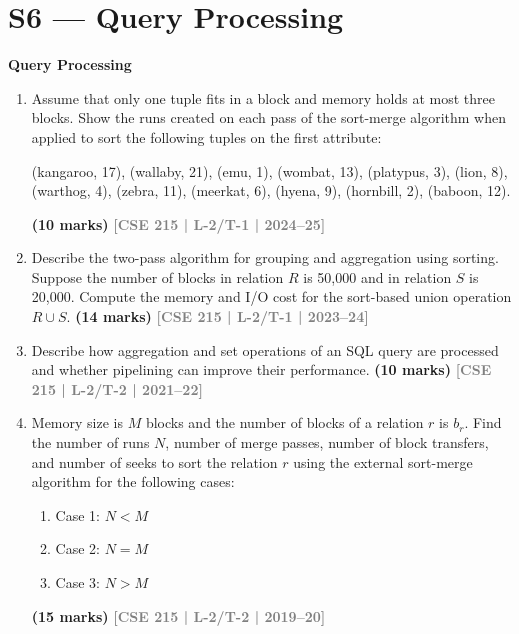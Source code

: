 \documentclass[12pt,a3paper]{article}
\newcommand{\yr}[1]{\hfill\textcolor{gray}{\small\textbf{[#1]}}}
\newcommand{\mk}[1]{\textcolor{orange!70!black}{\small\textbf{(#1 marks)}}}
\newcommand{\subtopic}[2]{%
  \vspace{10pt}
  \noindent\begin{tcolorbox}[colback=#1!8,colframe=#1,boxrule=0.6pt,arc=4pt,
    left=6pt,right=6pt,top=4pt,bottom=4pt]
    \small\bfseries\textcolor{#1}{#2}
  \end{tcolorbox}
  \vspace{2pt}
}
\begin{document}
\section{S6 --- Query Processing}
\label{sec:S6}

\subtopic{cD}{Query Processing}
\label{sub:s6-qp}

\begin{enumerate}

\item Assume that only one tuple fits in a block and memory holds at most three blocks. Show the runs created on each pass of the sort-merge algorithm when applied to sort the following tuples on the first attribute:
\begin{center}
(kangaroo, 17), (wallaby, 21), (emu, 1), (wombat, 13), (platypus, 3), (lion, 8),\\ (warthog, 4), (zebra, 11), (meerkat, 6), (hyena, 9), (hornbill, 2), (baboon, 12).
\end{center}
\mk{10} \yr{CSE 215 | L-2/T-1 | 2024--25}

\item Describe the two-pass algorithm for grouping and aggregation using sorting. Suppose the number of blocks in relation $R$ is 50,000 and in relation $S$ is 20,000. Compute the memory and I/O cost for the sort-based union operation $R \cup S$.
\mk{14} \yr{CSE 215 | L-2/T-1 | 2023--24}

\item Describe how aggregation and set operations of an SQL query are processed and whether pipelining can improve their performance.
\mk{10} \yr{CSE 215 | L-2/T-2 | 2021--22}

\item Memory size is $M$ blocks and the number of blocks of a relation $r$ is $b_r$. Find the number of runs $N$, number of merge passes, number of block transfers, and number of seeks to sort the relation $r$ using the external sort-merge algorithm for the following cases:
\begin{enumerate}
  \item Case 1: $N < M$
  \item Case 2: $N = M$
  \item Case 3: $N > M$
\end{enumerate}
\mk{15} \yr{CSE 215 | L-2/T-2 | 2019--20}


\end{enumerate}
\end{document}
